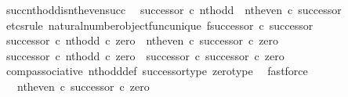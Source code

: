 \begin{isabellebody}
\ succ{\isacharunderscore}{\kern0pt}nth{\isacharunderscore}{\kern0pt}odd{\isacharunderscore}{\kern0pt}is{\isacharunderscore}{\kern0pt}nth{\isacharunderscore}{\kern0pt}even{\isacharunderscore}{\kern0pt}succ{\isacharcolon}{\kern0pt}\isanewline
\ \ {\isachardoublequoteopen}successor\ {\isasymcirc}\isactrlsub c\ nth{\isacharunderscore}{\kern0pt}odd\ {\isacharequal}{\kern0pt}\ nth{\isacharunderscore}{\kern0pt}even\ {\isasymcirc}\isactrlsub c\ successor{\isachardoublequoteclose}\isanewline
%
\isadelimproof
%
\endisadelimproof
%
\isatagproof
{}\isamarkupfalse%
\ {\isacharparenleft}{\kern0pt}etcs{\isacharunderscore}{\kern0pt}rule\ natural{\isacharunderscore}{\kern0pt}number{\isacharunderscore}{\kern0pt}object{\isacharunderscore}{\kern0pt}func{\isacharunderscore}{\kern0pt}unique{\isacharbrackleft}{\kern0pt}\ f{\isacharequal}{\kern0pt}{\isachardoublequoteopen}successor\ {\isasymcirc}\isactrlsub c\ successor{\isachardoublequoteclose}{\isacharbrackright}{\kern0pt}{\isacharparenright}{\kern0pt}\isanewline
\ \ \isamarkupfalse%
\ {\isachardoublequoteopen}{\isacharparenleft}{\kern0pt}successor\ {\isasymcirc}\isactrlsub c\ nth{\isacharunderscore}{\kern0pt}odd{\isacharparenright}{\kern0pt}\ {\isasymcirc}\isactrlsub c\ zero\ {\isacharequal}{\kern0pt}\ {\isacharparenleft}{\kern0pt}nth{\isacharunderscore}{\kern0pt}even\ {\isasymcirc}\isactrlsub c\ successor{\isacharparenright}{\kern0pt}\ {\isasymcirc}\isactrlsub c\ zero{\isachardoublequoteclose}\isanewline
\ \ \isamarkupfalse%
\ {\isacharminus}{\kern0pt}\isanewline
\ \ \ \ \isamarkupfalse%
\ {\isachardoublequoteopen}{\isacharparenleft}{\kern0pt}successor\ {\isasymcirc}\isactrlsub c\ nth{\isacharunderscore}{\kern0pt}odd{\isacharparenright}{\kern0pt}\ {\isasymcirc}\isactrlsub c\ zero\ {\isacharequal}{\kern0pt}\ successor\ {\isasymcirc}\isactrlsub c\ successor\ {\isasymcirc}\isactrlsub c\ zero{\isachardoublequoteclose}\isanewline
\ \ \ \ \ \ \isamarkupfalse%
\ comp{\isacharunderscore}{\kern0pt}associative{}\ nth{\isacharunderscore}{\kern0pt}odd{\isacharunderscore}{\kern0pt}def{}\ successor{\isacharunderscore}{\kern0pt}type\ zero{\isacharunderscore}{\kern0pt}type\ \isamarkupfalse%
\ fastforce\isanewline
\ \ \ \ \isamarkupfalse%
\ \isamarkupfalse%
\ {\isachardoublequoteopen}{\isachardot}{\kern0pt}{\isachardot}{\kern0pt}{\isachardot}{\kern0pt}\ {\isacharequal}{\kern0pt}\ {\isacharparenleft}{\kern0pt}nth{\isacharunderscore}{\kern0pt}even\ {\isasymcirc}\isactrlsub c\ successor{\isacharparenright}{\kern0pt}\ {\isasymcirc}\isactrlsub c\ zero{\isachardoublequoteclose}\isanewline

\end{isabellebody}
